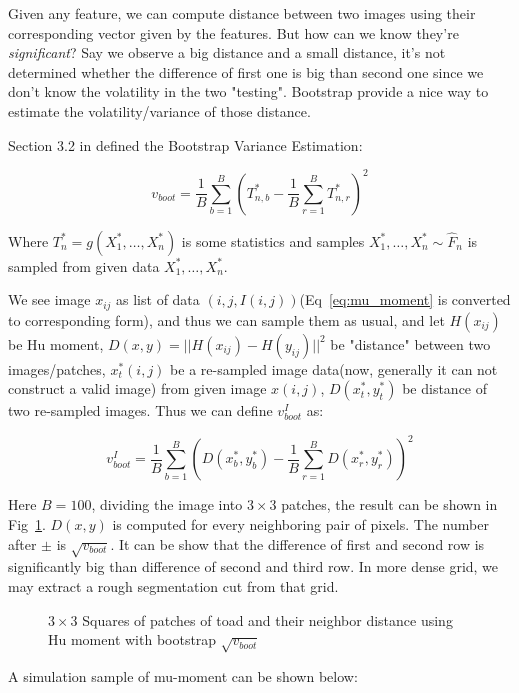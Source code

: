 \documentclass{article}
\begin{document}
Given any feature, we can compute distance between two images using their corresponding vector given by the features. But how can we know
they're \textit{significant}? Say we observe a big distance and a small distance, it's not determined whether the difference of first one is 
big than second one since we don't know the volatility in the two "testing". Bootstrap provide a nice way to estimate the volatility/variance
of those distance.

Section 3.2 in \cite{wasserman2006all} defined the Bootstrap Variance Estimation:

$$
v_{boot} = \frac{1}{B} \sum_{b=1}^B \left( T^*_{n,b} - \frac{1}{B}\sum_{r=1}^B T^*_{n,r} \right)^2
$$

Where $T_n^*=g(X_1^*,\dots,X_n^*)$ is some statistics and samples $X_1^*,\dots,X_n^* \sim \hat{F}_n$ is sampled from given data $X_1^*,\dots,X_n^*$.

We see image $x_{ij}$ as list of data $(i,j,I(i,j))$(Eq~\ref{eq:mu_moment} is converted to corresponding form), and thus we can sample them as usual,
and let $H(x_{ij})$ be Hu moment, $D(x,y)=||H(x_{ij}) - H(y_{ij})||^2$ be "distance" between two images/patches, $x_t^*(i,j)$ be a re-sampled
image data(now, generally it can not construct a valid image) from given image $x(i,j)$, $D(x_t^*,y_t^*)$ be distance of two re-sampled images. Thus we can define $v_{boot}^I$ as:

$$
v_{boot}^I = \frac{1}{B}\sum_{b=1}^B \left( D(x_b^*,y_b^*) - \frac{1}{B} \sum_{r=1}^B D(x_r^*,y_r^*) \right)^2
$$

Here $B=100$, dividing the image into $3 \times 3$ patches, the result can be shown in Fig~\ref{fig:square33}. 
$D(x,y)$ is computed for every neighboring pair of pixels. The number after $\pm$ is $\sqrt{v_{boot}}$. It can be show that
the difference of first and second row is significantly big than difference of second and third row. In more dense grid,
we may extract a rough segmentation cut from that grid.

\begin{figure}[htb]
  \centering
  
  \caption{$3 \times 3$ Squares of patches of toad and their neighbor distance using Hu moment with bootstrap $\sqrt{v_{boot}}$}
  \label{fig:square33}
\end{figure}

A simulation sample of mu-moment can be shown below:
\end{document}
